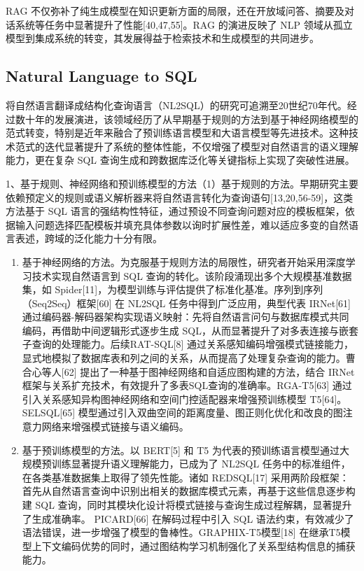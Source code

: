 \documentclass[12pt,a4paper,openright,UTF8]{ctexbook}
\begin{document}
RAG 不仅弥补了纯生成模型在知识更新方面的局限，还在开放域问答、摘要及对话系统等任务中显著提升了性能[40,47,55]。RAG 的演进反映了 NLP 领域从孤立模型到集成系统的转变，其发展得益于检索技术和生成模型的共同进步。

\subsection{Natural Language to SQL}

将自然语言翻译成结构化查询语言（NL2SQL）的研究可追溯至20世纪70年代。经过数十年的发展演进，该领域经历了从早期基于规则的方法到基于神经网络模型的范式转变，特别是近年来融合了预训练语言模型和大语言模型等先进技术。这种技术范式的迭代显著提升了系统的整体性能，不仅增强了模型对自然语言的语义理解能力，更在复杂 SQL 查询生成和跨数据库泛化等关键指标上实现了突破性进展。


1、基于规则、神经网络和预训练模型的方法（1）基于规则的方法。早期研究主要依赖预定义的规则或语义解析器来将自然语言转化为查询语句[13,20,56-59]，这类方法基于 SQL 语言的强结构性特征，通过预设不同查询问题对应的模板框架，依据输入问题选择匹配模板并填充具体参数以询时扩展性差，难以适应多变的自然语言表述，跨域的泛化能力十分有限。

\begin{enumerate}[label=(\arabic*)]
\item 基于神经网络的方法。为克服基于规则方法的局限性，研究者开始采用深度学习技术实现自然语言到 SQL 查询的转化。该阶段涌现出多个大规模基准数据集，如 Spider[11]，为模型训练与评估提供了标准化基准。序列到序列（Seq2Seq）框架[60] 在 NL2SQL 任务中得到广泛应用，典型代表 IRNet[61] 通过编码器-解码器架构实现语义映射：先将自然语言问句与数据库模式共同编码，再借助中间逻辑形式逐步生成 SQL，从而显著提升了对多表连接与嵌套子查询的处理能力。后续RAT-SQL[8] 通过关系感知编码增强模式链接能力，显式地模拟了数据库表和列之间的关系，从而提高了处理复杂查询的能力。曹合心等人[62] 提出了一种基于图神经网络和自适应图构建的方法，结合 IRNet 框架与关系扩充技术，有效提升了多表SQL查询的准确率。RGA-T5[63] 通过引入关系感知异构图神经网络和空间门控适配器来增强预训练模型 T5[64]。SELSQL[65] 模型通过引入双曲空间的距离度量、图正则化优化和改良的图注意力网络来增强模式链接与语义编码。
\item 基于预训练模型的方法。以 BERT[5] 和 T5 为代表的预训练语言模型通过大规模预训练显著提升语义理解能力，已成为了 NL2SQL 任务中的标准组件，在各类基准数据集上取得了领先性能。诸如 REDSQL[17] 采用两阶段框架：首先从自然语言查询中识别出相关的数据库模式元素，再基于这些信息逐步构建 SQL 查询，同时其模块化设计将模式链接与查询生成过程解耦，显著提升了生成准确率。 PICARD[66] 在解码过程中引入 SQL 语法约束，有效减少了语法错误，进一步增强了模型的鲁棒性。GRAPHIX-T5模型[18] 在继承T5模型上下文编码优势的同时，通过图结构学习机制强化了关系型结构信息的捕获能力。
\end{enumerate}
\end{document}
